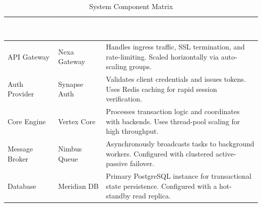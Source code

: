 \begin{table}[h]
\centering
\sffamily\small
\begin{tabularx}{\linewidth}{|l|p{3.5cm}|X|}
\hline
\rowcolor{primary}
\textcolor{white}{\textbf{Component}} & \textcolor{white}{\textbf{Fictional Service}} & \textcolor{white}{\textbf{Responsibility \& Scaling Strategy}} \\
\hline
API Gateway & Nexa Gateway & Handles ingress traffic, SSL termination, and rate-limiting. Scaled horizontally via auto-scaling groups. \\
\hline
\rowcolor{lightbg}
Auth Provider & Synapse Auth & Validates client credentials and issues tokens. Uses Redis caching for rapid session verification. \\
\hline
Core Engine & Vertex Core & Processes transaction logic and coordinates with backends. Uses thread-pool scaling for high throughput. \\
\hline
\rowcolor{lightbg}
Message Broker & Nimbus Queue & Asynchronously broadcasts tasks to background workers. Configured with clustered active-passive failover. \\
\hline
Database & Meridian DB & Primary PostgreSQL instance for transactional state persistence. Configured with a hot-standby read replica. \\
\hline
\end{tabularx}
\caption{System Component Matrix}
\end{table}
